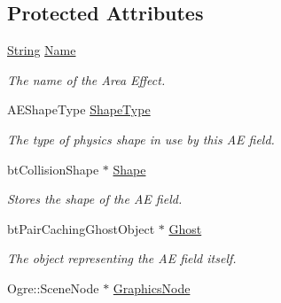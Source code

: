 \subsection*{Protected Attributes}
\begin{DoxyCompactItemize}
\item 
\hypertarget{classphys_1_1AreaEffect_a1cf5a878eb22b30a166f5b065944a986}{
\hyperlink{namespacephys_aa03900411993de7fbfec4789bc1d392e}{String} \hyperlink{classphys_1_1AreaEffect_a1cf5a878eb22b30a166f5b065944a986}{Name}}
\label{d4/d55/classphys_1_1AreaEffect_a1cf5a878eb22b30a166f5b065944a986}

\begin{DoxyCompactList}\small\item\em The name of the Area Effect. \item\end{DoxyCompactList}\item 
\hypertarget{classphys_1_1AreaEffect_a1465c564cc8e32b8a530881c5db70b88}{
AEShapeType \hyperlink{classphys_1_1AreaEffect_a1465c564cc8e32b8a530881c5db70b88}{ShapeType}}
\label{d4/d55/classphys_1_1AreaEffect_a1465c564cc8e32b8a530881c5db70b88}

\begin{DoxyCompactList}\small\item\em The type of physics shape in use by this AE field. \item\end{DoxyCompactList}\item 
\hypertarget{classphys_1_1AreaEffect_af8189f9e8dc4bf04f44550918e0ee117}{
btCollisionShape $\ast$ \hyperlink{classphys_1_1AreaEffect_af8189f9e8dc4bf04f44550918e0ee117}{Shape}}
\label{d4/d55/classphys_1_1AreaEffect_af8189f9e8dc4bf04f44550918e0ee117}

\begin{DoxyCompactList}\small\item\em Stores the shape of the AE field. \item\end{DoxyCompactList}\item 
\hypertarget{classphys_1_1AreaEffect_ae730c591bf929404f337d71d4119bde8}{
btPairCachingGhostObject $\ast$ \hyperlink{classphys_1_1AreaEffect_ae730c591bf929404f337d71d4119bde8}{Ghost}}
\label{d4/d55/classphys_1_1AreaEffect_ae730c591bf929404f337d71d4119bde8}

\begin{DoxyCompactList}\small\item\em The object representing the AE field itself. \item\end{DoxyCompactList}\item 
\hypertarget{classphys_1_1AreaEffect_a7fbb785d7357cc7eac68dc94bb72c18a}{
Ogre::SceneNode $\ast$ \hyperlink{classphys_1_1AreaEffect_a7fbb785d7357cc7eac68dc94bb72c18a}{GraphicsNode}}
\label{d4/d55/classphys_1_1AreaEffect_a7fbb785d7357cc7eac68dc94bb72c18a}


\end{DoxyCompactItemize}
